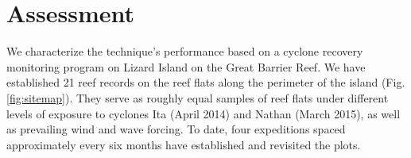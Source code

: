 \section{Assessment}

We characterize the technique's performance based on a cyclone recovery monitoring program on Lizard Island on the Great Barrier Reef. We have established 21 reef records on the reef flats along the perimeter of the island (Fig. \ref{fig:sitemap}). They serve as roughly equal samples of reef flats under different levels of exposure to cyclones Ita (April 2014) and Nathan (March 2015), as well as prevailing wind and wave forcing. To date, four expeditions spaced approximately every six months have established and revisited the plots.
